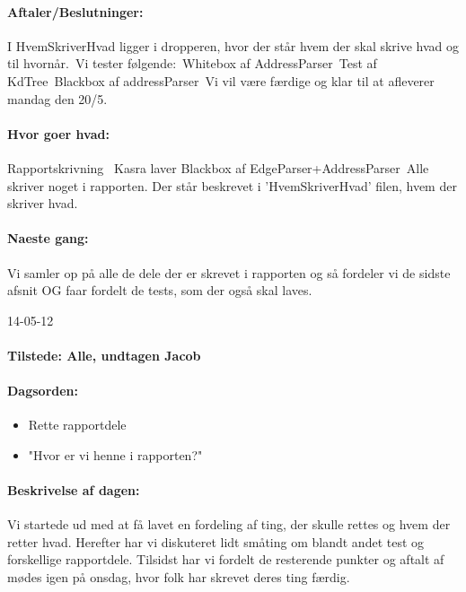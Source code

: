 \documentclass[a4paper,10pt,titlepage]{article}
\begin{document}
		\paragraph{Aftaler/Beslutninger:}
		I HvemSkriverHvad ligger i dropperen, hvor der står hvem der skal skrive hvad og til hvornår.\  
Vi tester følgende:\
Whitebox af AddressParser\
Test af KdTree\
Blackbox af addressParser\
Vi vil være færdige og klar til at afleverer mandag den 20/5. 

		\paragraph{Hvor goer hvad:}
		Rapportskrivning \
Kasra laver Blackbox af EdgeParser+AddressParser\
Alle skriver noget i rapporten. Der står beskrevet i ’HvemSkriverHvad’ filen, hvem der skriver hvad. 

		\paragraph{Naeste gang:}
Vi samler op på alle de dele der er skrevet i rapporten og så fordeler vi de sidste afsnit  OG faar fordelt de tests, som der også skal laves.\mbox{}\\

\begin{center}
		14-05-12
		\end{center}
		
		\paragraph{Tilstede: Alle, undtagen Jacob}
		\paragraph{Dagsorden:}
		\begin{itemize}
					\item Rette rapportdele
					\item "Hvor er vi henne i rapporten?"
					
		\end{itemize}
		
		\paragraph{Beskrivelse af dagen:}
		Vi startede ud med at få lavet en fordeling af ting, der skulle rettes og hvem der retter hvad. Herefter har vi diskuteret lidt småting om blandt andet test og forskellige rapportdele. Tilsidst har vi fordelt de resterende punkter og aftalt af mødes igen på onsdag, hvor folk har skrevet deres ting færdig.
\end{document}
